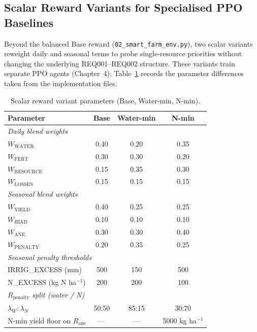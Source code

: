 \subsection{Scalar Reward Variants for Specialised PPO Baselines}

Beyond the balanced Base reward (\texttt{02\_smart\_farm\_env.py}), two scalar
variants reweight daily and seasonal terms to probe single-resource priorities
without changing the underlying REQ001--REQ002 structure. These variants train
separate PPO agents (Chapter~4); Table~\ref{tab:reward_variants} records the
parameter differences taken from the implementation files.

\begin{table}[ht]
\centering
\caption{Scalar reward variant parameters (Base, Water-min, N-min).}
\label{tab:reward_variants}
\small
\renewcommand{\arraystretch}{1.15}
\begin{tabular}{lccc}
\toprule
\textbf{Parameter} & \textbf{Base} & \textbf{Water-min} & \textbf{N-min} \\
\midrule
\multicolumn{4}{l}{\textit{Daily blend weights}} \\
\quad $W_{\text{WATER}}$    & 0.40 & 0.20 & 0.35 \\
\quad $W_{\text{FERT}}$     & 0.30 & 0.30 & 0.20 \\
\quad $W_{\text{RESOURCE}}$ & 0.15 & 0.35 & 0.30 \\
\quad $W_{\text{LOSSES}}$   & 0.15 & 0.15 & 0.15 \\
\midrule
\multicolumn{4}{l}{\textit{Seasonal blend weights}} \\
\quad $W_{\text{YIELD}}$    & 0.40 & 0.25 & 0.25 \\
\quad $W_{\text{HIAD}}$     & 0.10 & 0.10 & 0.10 \\
\quad $W_{\text{ANE}}$      & 0.30 & 0.30 & 0.40 \\
\quad $W_{\text{PENALTY}}$  & 0.20 & 0.35 & 0.25 \\
\midrule
\multicolumn{4}{l}{\textit{Seasonal penalty thresholds}} \\
\quad IRRIG\_EXCESS (mm)    & 500  & 150  & 500 \\
\quad N\_EXCESS (kg N ha$^{-1}$) & 200 & 200 & 100 \\
\midrule
\multicolumn{4}{l}{\textit{$R_{\text{penalty}}$ split (water / N)}} \\
\quad $\lambda_W : \lambda_N$ & 50:50 & 85:15 & 30:70 \\
\midrule
N-min yield floor on $R_{\text{ane}}$ & --- & --- & 5000 kg ha$^{-1}$ \\
\bottomrule
\end{tabular}
\end{table}

